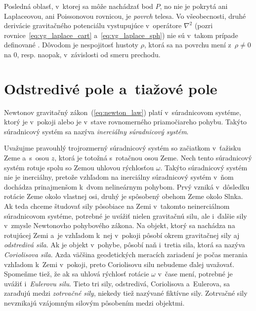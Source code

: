 \documentclass[a4paper, 12pt]{book}
\begin{document}
Posledná oblasť, v~ktorej sa môže nachádzať bod $P$, no nie je pokrytá ani 
Laplaceovou, ani Poissonovou rovnicou, je \emph{povrch} telesa.  Vo 
všeobecnosti, druhé derivácie gravitačného potenciálu vystupujúce v~operátore 
$\nabla^2$ (pozri rovnice~\ref{eq:vg_laplace_cart} a~\ref{eq:vg_laplace_sph}) 
nie sú v~takom prípade definované \citep{Kellogg1967}.  Dôvodom je nespojitosť 
hustoty $\rho$, ktorá sa na povrchu mení z~$\rho \neq 0$ na 0, resp. naopak, 
v~závislosti od smeru prechodu.






\section{Odstredivé pole a~tiažové pole}
\label{sec:centrifugal_gravity_field}

Newtonov gravitačný zákon~(\ref{eq:newton_law}) platí v~súradnicovom systéme, 
ktorý je v~pokoji alebo je v~stave rovnomerného priamočiareho pohybu.  Takýto 
súradnicový systém sa nazýva \emph{inerciálny súradnicový systém}.

Uvažujme pravouhlý trojrozmerný súradnicový systém so začiatkom v~ťažisku Zeme 
a~s~osou $z$, ktorá je totožná s~rotačnou osou Zeme.  Nech tento súradnicový 
systém rotuje spolu so Zemou uhlovou rýchlosťou $\omega$.  Takýto súradnicový 
systém nie je inerciálny, pretože vzhľadom na inerciálny súradnicový systém 
v~ňom dochádza prinajmenšom k~dvom nelineárnym pohybom.  Prvý vzniká v~dôsledku 
rotácie Zeme okolo vlastnej osi, druhý je spôsobený obehom Zeme okolo Slnka.  
Ak teda chceme študovať sily pôsobiace na Zemi v~takomto neinerciálnom 
súradnicovom systéme, potrebné je uvážiť nielen gravitačnú silu, ale i~ďalšie 
sily v~zmysle Newtonovho pohybového zákona.  Na objekt, ktorý sa nachádza na 
rotujúcej Zemi a~je vzhľadom k~nej v~pokoji pôsobí okrem gravitačnej sily aj 
\emph{odstredivá sila}.  Ak je objekt v~pohybe, pôsobí naň i~tretia sila, ktorá 
sa nazýva \emph{Coriolisova sila}.  Azda väčšina geodetických meracích 
zariadení je počas merania vzhľadom k~Zemi v~pokoji, preto Coriolisovu silu 
nebudeme ďalej uvažovať.  Spomeňme tiež, že ak sa uhlová rýchlosť rotácie 
$\omega$ v~čase mení, potrebné je uvážiť i~\emph{Eulerovu silu}.  Tieto tri 
sily, odstredivá, Coriolisova a~Eulerova, sa zaraďujú medzi \emph{zotrvačné 
sily}, niekedy tiež nazývané fiktívne sily.  Zotrvačné sily nevznikajú 
vzájomným silovým pôsobením medzi objektmi.
\end{document}
